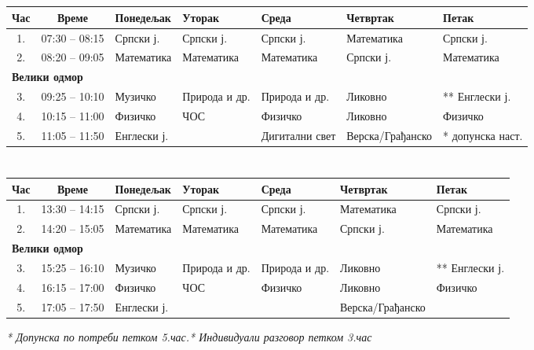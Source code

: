 \documentclass[14pt]{extarticle}
\begin{document}
\section*{%
}

\bigskip
\noindent
\begin{tabularx}{\textwidth}{|c|c|X|X|X|X|X|}
\hline
\textbf{Час} & \textbf{Време} & \textbf{Понедељак} & \textbf{Уторак} & \textbf{Среда} & \textbf{Четвртак} & \textbf{Петак} \\
\hline
1. & 07:30 -- 08:15 & Српски ј. & Српски ј. & Српски ј. & Математика & Српски ј. \\
\hline
2. & 08:20 -- 09:05 & Математика & Математика & Математика & Српски ј. & Математика \\
\hline
\multicolumn{7}{|l|}{\hspace*{1.1cm}\textbf{Велики одмор}} \\
\hline
3. & 09:25 -- 10:10 & Музичко & Природа и др. & Природа и др. & Ликовно & ** Енглески ј. \\
\hline
4. & 10:15 -- 11:00 & Физичко & ЧОС & Физичко & Ликовно & Физичко \\
\hline
5. & 11:05 -- 11:50 & Енглески ј. &  & Дигитални свет & Верска/Грађанско & * допунска наст.  \\
\hline
\end{tabularx}

\bigskip

\section*{%
}


\bigskip
\noindent
\begin{tabularx}{\textwidth}{|c|c|X|X|X|X|X|}
\hline
\textbf{Час} & \textbf{Време} & \textbf{Понедељак} & \textbf{Уторак} & \textbf{Среда} & \textbf{Четвртак} & \textbf{Петак} \\
\hline
1. & 13:30 -- 14:15 & Српски ј. & Српски ј. & Српски ј. & Математика & Српски ј. \\
\hline
2. & 14:20 -- 15:05 & Математика & Математика & Математика & Српски ј. & Математика \\
\hline
\multicolumn{7}{|l|}{\hspace*{1.1cm}\textbf{Велики одмор}} \\
\hline
3. & 15:25 -- 16:10 & Музичко & Природа и др. & Природа и др. & Ликовно & ** Енглески ј. \\
\hline
4. & 16:15 -- 17:00 & Физичко & ЧОС & Физичко & Ликовно & Физичко \\
\hline
5. & 17:05 -- 17:50 & Енглески ј. &  &  & Верска/Грађанско &  \\

\hline
\end{tabularx}

\bigskip
\bigskip
\noindent \textit{* Допунска по потреби петком 5.час.\hfill** Индивидуали разговор петком 3.час}
\end{document}
